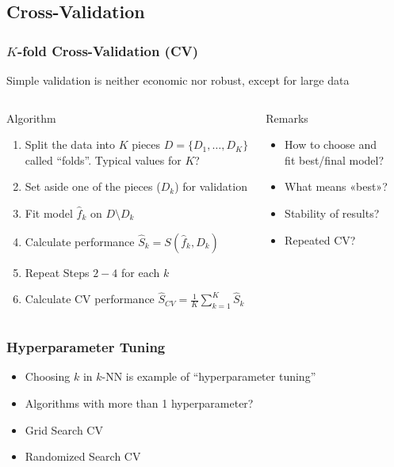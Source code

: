 \subsection{Cross-Validation}

\begin{frame}
	\frametitle{$K$-fold Cross-Validation (CV)}
	Simple validation is neither economic nor robust, except for large data
	
	\vfill
	
	\begin{columns}[onlytextwidth]
		\begin{block}{Algorithm}
			\begin{enumerate}
				\item Split the data into $K$ pieces $D = \{D_1, \dots, D_K\}$ called ``folds''. Typical values for $K$?
				\item Set aside one of the pieces ($D_k$) for validation
				\item Fit model $\hat f_k$ on $D \setminus D_k$
				\item Calculate performance $\hat S_k = S(\hat f_k, D_k)$
				\item Repeat Steps $2-4$ for each $k$
				\item Calculate \alert{CV performance} $\hat S_{CV} = \frac{1}{K} \sum_{k = 1}^K \hat S_k$
			\end{enumerate}
		\end{block}
		
		\begin{alertblock}{Remarks}
			\begin{itemize}
				\item How to choose and fit best/final model? 
				\item What means «best»?
				\item Stability of results?
				\item Repeated CV?
			\end{itemize}
		\end{alertblock}
		
		\begin{example}
		\end{example}
	\end{columns}
\end{frame}

\begin{frame}
	\frametitle{Hyperparameter Tuning}
	\begin{itemize}
		\item Choosing $k$ in $k$-NN is example of \alert{``hyperparameter tuning''}
		\item Algorithms with more than 1 hyperparameter?
		\item Grid Search CV
		\item Randomized Search CV
	\end{itemize}
\end{frame}

